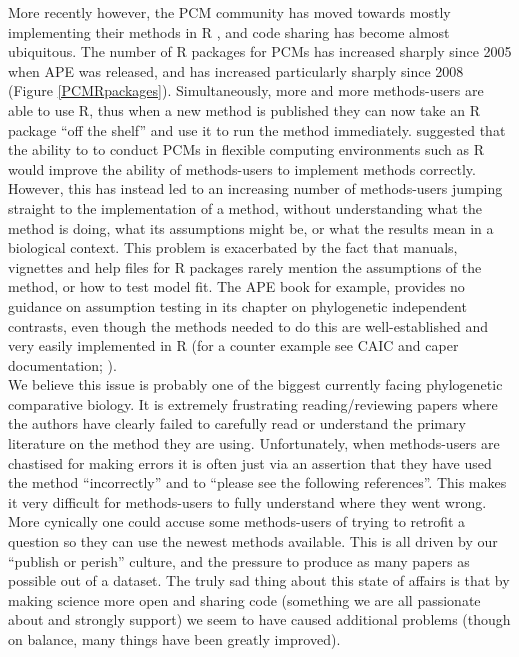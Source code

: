 \documentclass[a4paper,12pt]{article}
\begin{document}
More recently however, the PCM community has moved towards mostly implementing their methods in R \citep{R-Core-Team:2014aa}, and code sharing has become almost ubiquitous. 
The number of R packages for PCMs has increased sharply since 2005 when APE \citep{Paradis:2004aa} was released, and has increased particularly sharply since 2008 (Figure \ref{PCMRpackages}).
Simultaneously, more and more methods-users are able to use R, thus when a new method is published they can now take an R package ``off the shelf'' and use it to run the method immediately.
\citet{freckleton2009seven} suggested that the ability to to conduct PCMs in flexible computing environments such as R would improve the ability of methods-users to implement methods correctly. 
However, this has instead led to an increasing number of methods-users jumping straight to the implementation of a method, without understanding what the method is doing, what its assumptions might be, or what the results mean in a biological context.
This problem is exacerbated by the fact that manuals, vignettes and help files for R packages rarely mention the assumptions of the method, or how to test model fit. 
The APE book \citep{paradis2011analysis} for example, provides no guidance on assumption testing in its chapter on phylogenetic independent contrasts, even though the methods needed to do this are well-established and very easily implemented in R (for a counter example see CAIC and caper documentation; \citealp{purvis1995comparative,Orme:2013aa}).\\
We believe this issue is probably one of the biggest currently facing phylogenetic comparative biology. It is extremely frustrating reading/reviewing papers where the authors have clearly failed to carefully read or understand the primary literature on the method they are using. 
Unfortunately, when methods-users are chastised for making errors it is often just via an assertion that they have used the method ``incorrectly'' and to ``please see the following references''.
This makes it very difficult for methods-users to fully understand where they went wrong.
More cynically one could accuse some methods-users of trying to retrofit a question so they can use the newest methods available. This is all driven by our ``publish or perish'' culture, and the pressure to produce as many papers as possible out of a dataset.
The truly sad thing about this state of affairs is that by making science more open and sharing code (something we are all passionate about and strongly support) we seem to have caused additional problems (though on balance, many things have been greatly improved).
\end{document}
